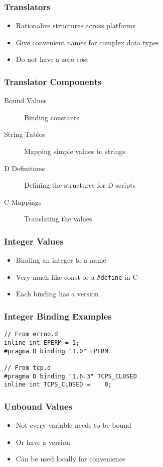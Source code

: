 \documentclass[pdftex]{beamer}
\begin{document}
\begin{frame}
  \frametitle{Translators}
  \begin{itemize}
  \item Rationalize structures across platforms
  \item Give convenient names for complex data types 
  \item Do not have a zero cost
  \end{itemize}
\end{frame}

\begin{frame}
  \frametitle{Translator Components}
  \begin{description}
  \item[Bound Values] Binding constants
  \item[String Tables] Mapping simple values to strings
  \item[D Definitions] Defining the structures for D scripts
  \item[C Mappings] Translating the values
  \end{description}
\end{frame}

\begin{frame}[fragile]
  \frametitle{Integer Values}
  \begin{itemize}
  \item Binding an integer to a name
  \item Very much like const or a \verb+#define+ in C
  \item Each binding has a version
  \end{itemize}
\end{frame}

\begin{frame}[fragile]
  \frametitle{Integer Binding Examples}
\begin{lstlisting}
// From errno.d
inline int EPERM = 1;
#pragma D binding "1.0" EPERM

// From tcp.d
#pragma D binding "1.6.3" TCPS_CLOSED
inline int TCPS_CLOSED =	0;
\end{lstlisting}
\end{frame}

\begin{frame}
  \frametitle{Unbound Values}
  \begin{itemize}
  \item Not every variable needs to be bound
  \item Or have a version
  \item Can be used locally for convenience
  \end{itemize}
\end{frame}
\end{document}
